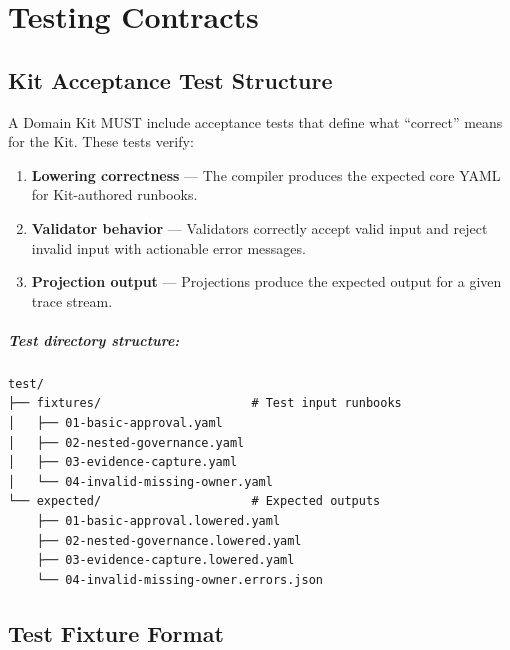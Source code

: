 
\chapter{Testing Contracts}
\label{ch:testing-contracts}

\section{Kit Acceptance Test Structure}
\label{sec:test-structure}

A Domain Kit MUST include acceptance tests that define what ``correct'' means
for the Kit. These tests verify:

\begin{enumerate}
  \item \textbf{Lowering correctness} --- The compiler produces the expected
    core YAML for Kit-authored runbooks.
  \item \textbf{Validator behavior} --- Validators correctly accept valid input
    and reject invalid input with actionable error messages.
  \item \textbf{Projection output} --- Projections produce the expected output
    for a given trace stream.
\end{enumerate}

\paragraph{Test directory structure:}

\begin{verbatim}
test/
├── fixtures/                     # Test input runbooks
│   ├── 01-basic-approval.yaml
│   ├── 02-nested-governance.yaml
│   ├── 03-evidence-capture.yaml
│   └── 04-invalid-missing-owner.yaml
└── expected/                     # Expected outputs
    ├── 01-basic-approval.lowered.yaml
    ├── 02-nested-governance.lowered.yaml
    ├── 03-evidence-capture.lowered.yaml
    └── 04-invalid-missing-owner.errors.json
\end{verbatim}

\section{Test Fixture Format}
\label{sec:fixture-format}

